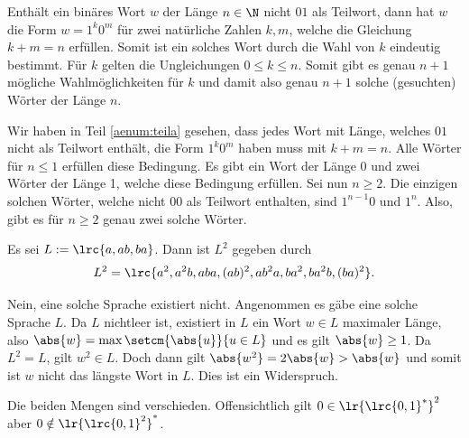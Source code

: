 \begin{myanswer}[myexercise:kp01]
	\begin{aenum}
		\item\label{aenum:teila} Enthält ein binäres Wort $w$ der Länge $n\in\N$ nicht $01$ als Teilwort, dann hat $w$ die Form $w = 1^k0^m$ für zwei natürliche Zahlen $k, m$, welche die Gleichung $k + m = n$ erfüllen. Somit ist ein solches Wort durch die Wahl von $k$ eindeutig bestimmt. Für $k$ gelten die Ungleichungen $0\leq k \leq n$. Somit gibt es genau $n+1$ mögliche Wahlmöglichkeiten für $k$ und damit also genau $n+1$ solche (gesuchten) Wörter der Länge $n$.
		\item Wir haben in Teil \ref{aenum:teila} gesehen, dass jedes Wort mit Länge, welches $01$ nicht als Teilwort enthält, die Form $1^k0^m$ haben muss mit $k + m = n$. Alle Wörter für $n\leq 1$ erfüllen diese Bedingung. Es gibt ein Wort der Länge 0 und zwei Wörter der Länge 1, welche diese Bedingung erfüllen. Sei nun $n \geq 2$. Die einzigen solchen Wörter, welche nicht $00$ als Teilwort enthalten, sind $1^{n-1}0$ und $1^n$. Also, gibt es für $n\geq 2$ genau zwei solche Wörter.
	\end{aenum}
\end{myanswer}

\begin{myanswer}[myexercise:kp02]
	\begin{aenum}
		\item Es sei $L := \lrc{a, ab, ba}$. Dann ist $L^2$ gegeben durch
		\begin{align*}
			L^2 = \lrc{a^2, a^2b, aba, (ab)^2, ab^2a, ba^2, ba^2b, (ba)^2}.
		\end{align*}

		\item Nein, eine solche Sprache existiert nicht. Angenommen es gäbe eine solche Sprache $L$. Da $L$ nichtleer ist, existiert in $L$ ein Wort $w\in L$ maximaler Länge, also $\abs{w} = \max\setcm{\abs{u}}{u\in L}$ und es gilt $\abs{w}\geq 1$. Da $L^2 = L$, gilt $w^2\in L$. Doch dann gilt $\abs{w^2}= 2\abs{w}>\abs{w}$ und somit ist $w$ nicht das längste Wort in $L$. Dies ist ein Widerspruch.
	\end{aenum}
\end{myanswer}

\begin{myanswer}[myexercise:kp03]
	Die beiden Mengen sind verschieden. Offensichtlich gilt $0\in \lr{\lrc{0, 1}^*}^2$ aber $0\notin \lr{\lrc{0, 1}^2}^*$.
\end{myanswer}
